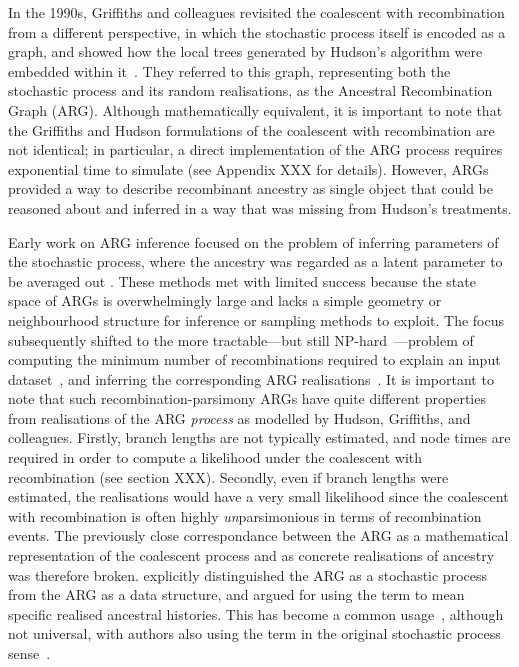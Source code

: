 \documentclass{article}
\begin{document}
In the 1990s, Griffiths and colleagues revisited the
coalescent with recombination from a different perspective,
in which the stochastic process itself is encoded as a graph,
and showed how the local trees generated by Hudson's algorithm
were embedded within
it~\citep{griffiths1991two,ethier1990two,griffiths1996ancestral,griffiths1997ancestral}.
They referred to this graph,
representing both the stochastic process and
its random realisations, as the Ancestral Recombination Graph (ARG).
Although mathematically equivalent, it is
important to note that the Griffiths and Hudson formulations of
the coalescent with recombination are not identical;
in particular, a direct implementation of the ARG process
requires exponential time to simulate
(see Appendix XXX for details). However, ARGs provided a way
to describe recombinant ancestry as single object that
could be reasoned about and inferred in a way
that was missing from Hudson's treatments.

Early work on ARG inference focused on the problem of
inferring parameters of the
stochastic process, where the ancestry was regarded as a
latent parameter to be averaged out
\citep[e.g.][]{griffiths1996ancestral,kuhner2000maximum, nielsen2000estimation,
fearnhead2001estimating}.
These methods met with limited success
because the state space of ARGs is overwhelmingly large and
lacks a simple geometry or neighbourhood structure for inference or
sampling methods to  exploit.
The focus subsequently shifted to the more
tractable---but still NP-hard~\citep{wang2001perfect}---problem of computing
the minimum number of recombinations required
to explain an input dataset~\citep{myers2003bounds}, and inferring the corresponding
ARG realisations~\citep{song2003parsimonious,song2005efficient,lyngso2005minimum}.
It is important to note that such recombination-parsimony ARGs
have quite different properties from realisations of the
ARG \emph{process} as modelled by Hudson, Griffiths, and colleagues.
Firstly, branch lengths are not typically estimated,
and node times are required in order to compute a likelihood under the
coalescent with recombination (see section XXX).
Secondly, even if branch lengths were estimated,
the realisations would have a very small likelihood since
the coalescent with recombination is often highly \emph{un}parsimonious
in terms of recombination events.
The previously close correspondance
between the ARG as a mathematical representation of the coalescent process
and as concrete realisations of ancestry was therefore broken.
\cite{minichiello2006mapping} explicitly distinguished the ARG as a
stochastic process from the ARG as a data structure, and
argued for using the term to mean specific realised ancestral histories.
This has become a common
usage~\citep[e.g.][]{gusfield2014recombinatorics,mathieson2020ancestry,brandt2021evaluation},
although not universal, with authors also using the term
in the original stochastic
process sense~\citep[e.g.][]{nordborg2000linkage,birkner2013ancestral,
wilton2015smc,griffiths2016coalescent}.
\end{document}
